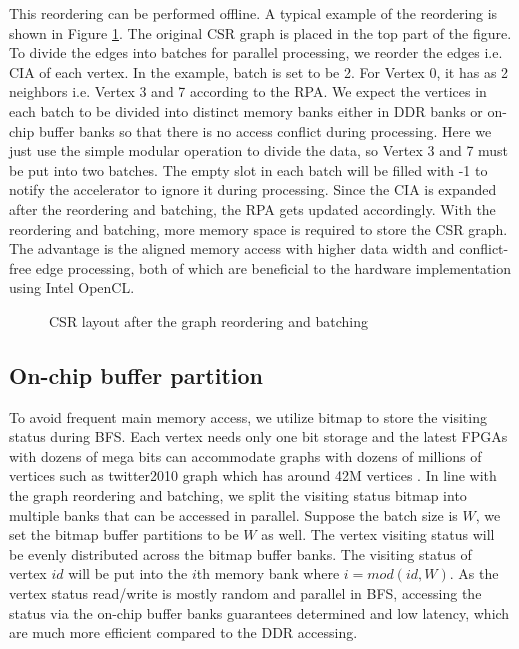 This reordering can be performed offline.
A typical example of the reordering is shown in Figure \ref{fig:graph-reorder}. 
The original CSR graph is placed in the top part of the figure. 
To divide the edges into batches for parallel processing, we reorder the edges i.e. CIA 
of each vertex. In the example, batch is set to be 2. For Vertex 0, 
it has as 2 neighbors i.e. Vertex 3 and 7 according to the RPA. 
We expect the vertices in each batch to be divided into distinct memory 
banks either in DDR banks or on-chip buffer banks so that there is no 
access conflict during processing. Here we just use the simple modular 
operation to divide the data, so Vertex 3 and 7 must be put into two batches.
The empty slot in each batch will be filled with -1 to notify the accelerator to 
ignore it during processing. Since the CIA is expanded after 
the reordering and batching, the RPA gets updated accordingly.
With the reordering and batching, more memory space is required to store the 
CSR graph. The advantage is the aligned memory access 
with higher data width and conflict-free edge processing, 
both of which are beneficial to the hardware implementation 
using Intel OpenCL.

\begin{figure}
    \caption{CSR layout after the graph reordering and batching}
\label{fig:graph-reorder}
\vspace{-1em}
\end{figure}

\subsection{On-chip buffer partition}
To avoid frequent main memory access, we utilize bitmap to store 
the visiting status during BFS. Each vertex needs only one bit 
storage and the latest FPGAs with dozens of mega bits can accommodate 
graphs with dozens of millions of vertices such as twitter2010 graph which has 
around 42M vertices \cite{boldi2011layered}. In line with the graph reordering 
and batching, we split the visiting status bitmap into multiple banks that 
can be accessed in parallel. Suppose the batch size is $W$, we set the 
bitmap buffer partitions to be $W$ as well. The vertex visiting status will 
be evenly distributed across the bitmap buffer banks. The visiting status of 
vertex $id$ will be put into the $i$th memory bank where $i = mod(id, W)$.
As the vertex status read/write is mostly random and parallel in BFS, 
accessing the status via the on-chip buffer banks guarantees determined 
and low latency, which are much  more efficient compared to the DDR 
accessing. 

